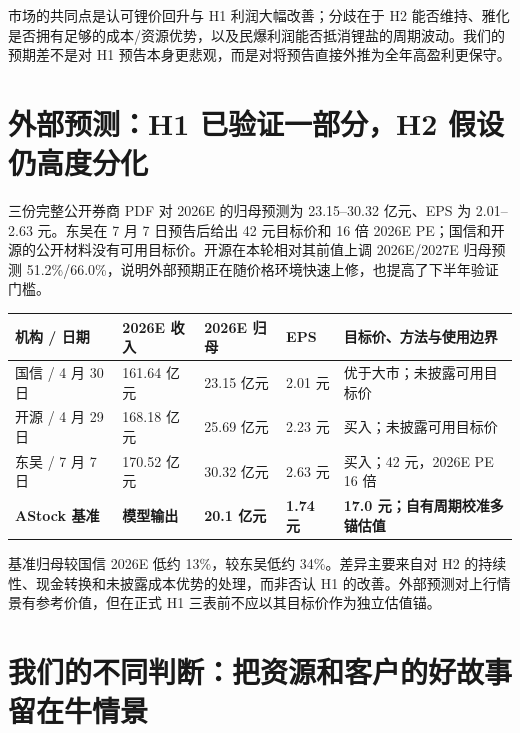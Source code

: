 市场的共同点是认可锂价回升与 H1 利润大幅改善；分歧在于 H2 能否维持、雅化是否拥有足够的成本/资源优势，以及民爆利润能否抵消锂盐的周期波动。我们的预期差不是对 H1 预告本身更悲观，而是对将预告直接外推为全年高盈利更保守。

\section{外部预测：H1 已验证一部分，H2 假设仍高度分化}

三份完整公开券商 PDF 对 2026E 的归母预测为 23.15--30.32 亿元、EPS 为 2.01--2.63 元。东吴在 7 月 7 日预告后给出 42 元目标价和 16 倍 2026E PE；国信和开源的公开材料没有可用目标价。开源在本轮相对其前值上调 2026E/2027E 归母预测 51.2\%/66.0\%，说明外部预期正在随价格环境快速上修，也提高了下半年验证门槛。

\begin{exhibitbox}
\begin{tabularx}{\exhibitboxwidth}{L{2.2cm}R{2.1cm}R{2.1cm}R{1.9cm}X}
\toprule
机构 / 日期 & 2026E 收入 & 2026E 归母 & EPS & 目标价、方法与使用边界 \\
\midrule
国信 / 4 月 30 日 & 161.64 亿元 & 23.15 亿元 & 2.01 元 & 优于大市；未披露可用目标价 \\
开源 / 4 月 29 日 & 168.18 亿元 & 25.69 亿元 & 2.23 元 & 买入；未披露可用目标价 \\
东吴 / 7 月 7 日 & 170.52 亿元 & 30.32 亿元 & 2.63 元 & 买入；42 元，2026E PE 16 倍 \\
\textbf{AStock 基准} & \textbf{模型输出} & \textbf{20.1 亿元} & \textbf{1.74 元} & \textbf{17.0 元；自有周期校准多锚估值} \\
\bottomrule
\end{tabularx}
\end{exhibitbox}

基准归母较国信 2026E 低约 13\%，较东吴低约 34\%。差异主要来自对 H2 的持续性、现金转换和未披露成本优势的处理，而非否认 H1 的改善。外部预测对上行情景有参考价值，但在正式 H1 三表前不应以其目标价作为独立估值锚。

\section{我们的不同判断：把资源和客户的好故事留在牛情景}

